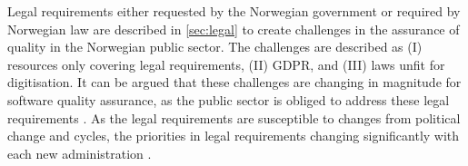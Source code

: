 
Legal requirements either requested by the Norwegian government or required by Norwegian law are described in \autoref{sec:legal} to create challenges in the assurance of quality in the Norwegian public sector. The challenges are described as (I) resources only covering legal requirements, (II) GDPR, and (III) laws unfit for digitisation. It can be argued that these challenges are changing in magnitude for software quality assurance, as the public sector is obliged to address these legal requirements \cite{jc_2010}. As the legal requirements are susceptible to changes from political change and cycles, the priorities in legal requirements changing significantly with each new administration \cite{jc_2010}.



